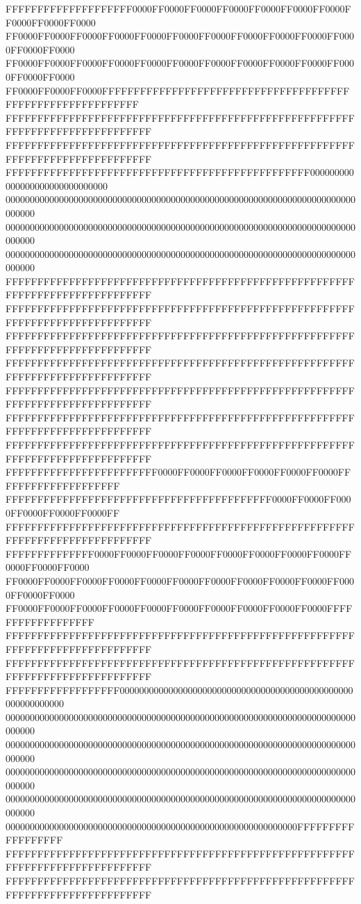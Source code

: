 FFFFFFFFFFFFFFFFFFFF0000FF0000FF0000FF0000FF0000FF0000FF0000FF0000FF0000FF0000
FF0000FF0000FF0000FF0000FF0000FF0000FF0000FF0000FF0000FF0000FF0000FF0000FF0000
FF0000FF0000FF0000FF0000FF0000FF0000FF0000FF0000FF0000FF0000FF0000FF0000FF0000
FF0000FF0000FF0000FFFFFFFFFFFFFFFFFFFFFFFFFFFFFFFFFFFFFFFFFFFFFFFFFFFFFFFFFFFF
FFFFFFFFFFFFFFFFFFFFFFFFFFFFFFFFFFFFFFFFFFFFFFFFFFFFFFFFFFFFFFFFFFFFFFFFFFFFFF
FFFFFFFFFFFFFFFFFFFFFFFFFFFFFFFFFFFFFFFFFFFFFFFFFFFFFFFFFFFFFFFFFFFFFFFFFFFFFF
FFFFFFFFFFFFFFFFFFFFFFFFFFFFFFFFFFFFFFFFFFFFFFFF000000000000000000000000000000
000000000000000000000000000000000000000000000000000000000000000000000000000000
000000000000000000000000000000000000000000000000000000000000000000000000000000
000000000000000000000000000000000000000000000000000000000000000000000000000000
FFFFFFFFFFFFFFFFFFFFFFFFFFFFFFFFFFFFFFFFFFFFFFFFFFFFFFFFFFFFFFFFFFFFFFFFFFFFFF
FFFFFFFFFFFFFFFFFFFFFFFFFFFFFFFFFFFFFFFFFFFFFFFFFFFFFFFFFFFFFFFFFFFFFFFFFFFFFF
FFFFFFFFFFFFFFFFFFFFFFFFFFFFFFFFFFFFFFFFFFFFFFFFFFFFFFFFFFFFFFFFFFFFFFFFFFFFFF
FFFFFFFFFFFFFFFFFFFFFFFFFFFFFFFFFFFFFFFFFFFFFFFFFFFFFFFFFFFFFFFFFFFFFFFFFFFFFF
FFFFFFFFFFFFFFFFFFFFFFFFFFFFFFFFFFFFFFFFFFFFFFFFFFFFFFFFFFFFFFFFFFFFFFFFFFFFFF
FFFFFFFFFFFFFFFFFFFFFFFFFFFFFFFFFFFFFFFFFFFFFFFFFFFFFFFFFFFFFFFFFFFFFFFFFFFFFF
FFFFFFFFFFFFFFFFFFFFFFFFFFFFFFFFFFFFFFFFFFFFFFFFFFFFFFFFFFFFFFFFFFFFFFFFFFFFFF
FFFFFFFFFFFFFFFFFFFFFFFF0000FF0000FF0000FF0000FF0000FF0000FFFFFFFFFFFFFFFFFFFF
FFFFFFFFFFFFFFFFFFFFFFFFFFFFFFFFFFFFFFFFFF0000FF0000FF0000FF0000FF0000FF0000FF
FFFFFFFFFFFFFFFFFFFFFFFFFFFFFFFFFFFFFFFFFFFFFFFFFFFFFFFFFFFFFFFFFFFFFFFFFFFFFF
FFFFFFFFFFFFFF0000FF0000FF0000FF0000FF0000FF0000FF0000FF0000FF0000FF0000FF0000
FF0000FF0000FF0000FF0000FF0000FF0000FF0000FF0000FF0000FF0000FF0000FF0000FF0000
FF0000FF0000FF0000FF0000FF0000FF0000FF0000FF0000FF0000FF0000FFFFFFFFFFFFFFFFFF
FFFFFFFFFFFFFFFFFFFFFFFFFFFFFFFFFFFFFFFFFFFFFFFFFFFFFFFFFFFFFFFFFFFFFFFFFFFFFF
FFFFFFFFFFFFFFFFFFFFFFFFFFFFFFFFFFFFFFFFFFFFFFFFFFFFFFFFFFFFFFFFFFFFFFFFFFFFFF
FFFFFFFFFFFFFFFFFF000000000000000000000000000000000000000000000000000000000000
000000000000000000000000000000000000000000000000000000000000000000000000000000
000000000000000000000000000000000000000000000000000000000000000000000000000000
000000000000000000000000000000000000000000000000000000000000000000000000000000
000000000000000000000000000000000000000000000000000000000000000000000000000000
000000000000000000000000000000000000000000000000000000000000FFFFFFFFFFFFFFFFFF
FFFFFFFFFFFFFFFFFFFFFFFFFFFFFFFFFFFFFFFFFFFFFFFFFFFFFFFFFFFFFFFFFFFFFFFFFFFFFF
FFFFFFFFFFFFFFFFFFFFFFFFFFFFFFFFFFFFFFFFFFFFFFFFFFFFFFFFFFFFFFFFFFFFFFFFFFFFFF
